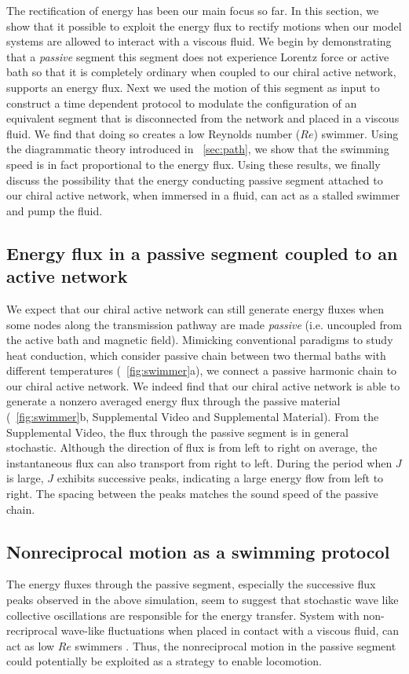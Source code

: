 \documentclass[
 preprint,
 preprintnumbers,
 amsmath,amssymb,
 aps,
 pre,
 longbibliography,
 superscriptaddress,
 10pt, twocolumn
]{revtex4-1}
\begin{document}
The rectification of energy has been our main focus so far. In this section, we show that it possible to exploit the energy flux to rectify motions when our model systems are allowed to interact with a viscous fluid.
We begin by demonstrating that a {\it passive} segment \textendash this segment does not experience Lorentz force or active bath so that it is completely ordinary \textendash when coupled to our chiral active network, supports an energy flux.
Next we used the motion of this segment as input to construct a time dependent protocol to modulate the configuration of an equivalent segment that is disconnected from the network and placed in a viscous fluid. We find that doing so creates a low Reynolds number ($Re$) swimmer. Using the diagrammatic theory introduced in \secname~\ref{sec:path}, we show that the swimming speed is in fact proportional to the energy flux.
Using these results, we finally discuss the possibility that the energy conducting passive segment attached to our chiral active network, when immersed in a fluid, can act as a stalled swimmer and pump the fluid.

\subsection{Energy flux in a passive segment coupled to an active network}
We expect that our chiral active network can still generate energy fluxes when some nodes along the transmission pathway are made {\it passive} (i.e. uncoupled from the active bath and magnetic field).
Mimicking conventional paradigms to study heat conduction, which consider passive chain between two thermal baths with different temperatures (\figurename~\ref{fig:swimmer}a), we connect a passive harmonic chain to our chiral active network.
We indeed find that our chiral active network is able to generate a nonzero averaged energy flux through the passive material (\figurename~\ref{fig:swimmer}b, Supplemental Video and Supplemental Material).
From the Supplemental Video, the flux through the passive segment is in general stochastic. Although the direction of flux is from left to right on average, the instantaneous flux can also transport from right to left. During the period when $J$ is large, $J$ exhibits successive peaks, indicating a large energy flow from left to right. The spacing between the peaks matches the sound speed of the passive chain.


\subsection{Nonreciprocal motion as a swimming protocol}
The energy fluxes through the passive segment, especially the successive flux peaks observed in the above simulation, seem to suggest that stochastic wave like collective oscillations are responsible for the energy transfer. System with non-recriprocal wave-like fluctuations when placed in contact with a viscous fluid, can act as low $Re$ swimmers \cite{Taylor1951AnalysisSwimming,Purcell1977LifeLow,Golestanian2008AnalyticResults}. Thus, the nonreciprocal motion in the passive segment could potentially be exploited as a strategy to enable locomotion.
\end{document}
